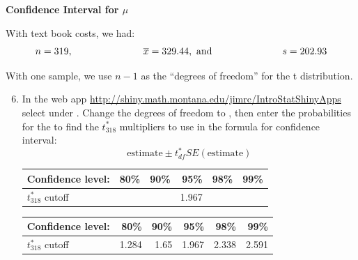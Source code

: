 \begin{center}
  {\large\bf Confidence Interval for $\mu$}
\end{center}

With text book costs, we had:
$$ n = 319, \mbox{\hspace{1in}} \overline{x} = 329.44, \mbox{ and\hspace{1in}}  s = 202.93 $$

With one sample, we use $n-1$ as the ``degrees of freedom'' for the t
distribution.  
\begin{enumerate}
  \setcounter{enumi}{5}
\item In the web app
  \url{http://shiny.math.montana.edu/jimrc/IntroStatShinyApps} select
   under . Change the degrees of
  freedom to , then enter the probabilities for the
   to find the $t^*_{318}$ multipliers to use in the
  formula for confidence interval:
     $$  \mbox{estimate} \pm t^*_{df} SE(\mbox{estimate}) $$
\begin{students}
   \begin{tabular}{l|rrrrr}
    Confidence level: &  \hspace{1cm}80\% &  \hspace{1cm}90\% &  \hspace{1cm}95\% & \hspace{1cm} 98\% & \hspace{1cm} 99\% \\ \hline
    $t_{318}^*$ cutoff  &  &  & 1.967 &  & 
  \end{tabular}\vspace{.2cm}
\end{students}
\begin{key}
   \begin{tabular}{l|rrrrr}
    Confidence level: &  \hspace{1cm}80\% &  \hspace{1cm}90\% &  \hspace{1cm}95\% & \hspace{1cm} 98\% & \hspace{1cm} 99\% \\ \hline
    $t_{318}^*$ cutoff  &1.284  &1.65  & 1.967 &2.338& 2.591
  \end{tabular}\vspace{.2cm}
\end{key}


\end{enumerate}
